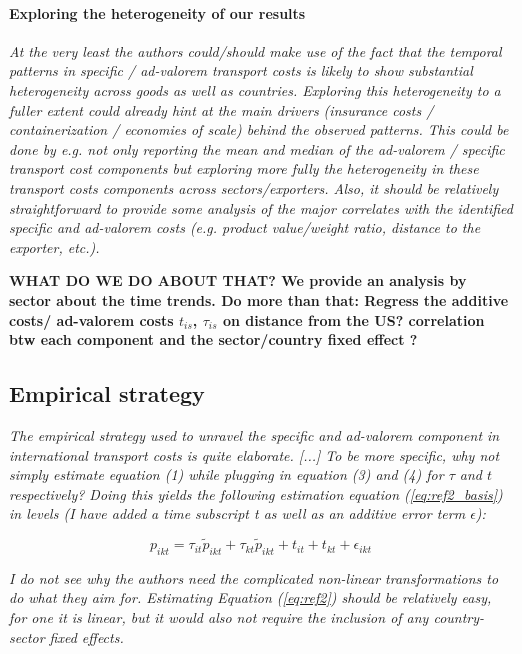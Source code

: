 \documentclass[a4paper,11pt]{article}
\begin{document}
\paragraph{Exploring the heterogeneity of our results} \textit{At the very least the authors could/should make use of the fact that the temporal patterns in specific / ad-valorem transport costs is likely to show substantial heterogeneity across goods as well as countries. Exploring this heterogeneity to a fuller extent could already hint at the main drivers (insurance costs / containerization / economies of scale) behind the observed patterns. This could be done by e.g. not only reporting the mean and median of the ad-valorem / specific transport cost components but exploring more fully the heterogeneity in these transport costs components across sectors/exporters. Also, it should be relatively straightforward to provide some analysis of the major correlates with the identified specific and ad-valorem costs (e.g. product value/weight ratio, distance to the exporter, etc.).}


\textbf{WHAT DO WE DO ABOUT THAT? We provide an analysis by sector about the time trends. Do more than that: Regress the additive costs/ ad-valorem costs $t_{is}$, $\tau_{is}$ on distance from the US? correlation btw each component and the sector/country fixed effect ?}

\subsection{Empirical strategy}

\textit{The empirical strategy used to unravel the specific and ad-valorem component in international
transport costs is quite elaborate. [...] To be more specific, why not simply estimate equation (1) while plugging
in equation (3) and (4) for $\tau$ and $t$ respectively? Doing this yields the following estimation equation (\ref{eq:ref2_basis}) in
levels (I have added a time subscript t as well as an additive error term $\epsilon$):}

\begin{equation}
p_{ikt}=\tau_{it}\widetilde{p}_{ikt}+ \tau_{kt}\widetilde{p}_{ikt} + t_{it} + t_{kt} + \epsilon_{ikt}   \label{eq:ref2_basis}
\end{equation}

\textit{I do not see why the authors need the complicated non-linear transformations to do what they aim
for. Estimating Equation (\ref{eq:ref2}) should be relatively easy, for one it is linear, but it would also not require the
inclusion of any country-sector fixed effects.}
\end{document}
